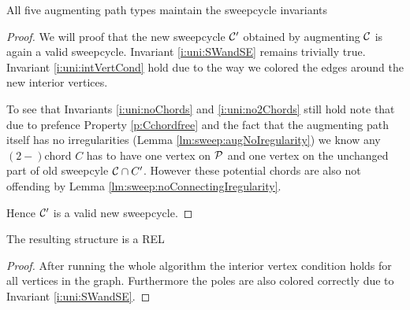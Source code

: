     \begin{lemma}
      All five augmenting path types maintain the sweepcycle invariants
    \end{lemma}
    \begin{proof}
      We will proof that the new sweepcycle $\C'$ obtained by augmenting $\C$ is again a valid sweepcycle. Invariant \ref{i:uni:SWandSE} remains trivially true. Invariant \ref{i:uni:intVertCond} hold due to the way we colored the edges around the new interior vertices.

      To see that Invariants \ref{i:uni:noChords} and \ref{i:uni:no2Chords} still hold note that due to prefence Property \ref{p:Cchordfree} and the fact that the augmenting path itself has no irregularities (Lemma \ref{lm:sweep:augNoIregularity})
      we know any $(2-)$chord $C$ has to have one vertex on $\P$ and one vertex on the unchanged part of old sweepcyle $\C \cap C'$. However these potential chords are also not offending by Lemma \ref{lm:sweep:noConnectingIregularity}.

      Hence $\C'$ is a valid new sweepcycle.
    \end{proof}

    \begin{lemma}
      \label{lm:sweep:REL}
      The resulting structure is a REL
    \end{lemma}

    \begin{proof}
      After running the whole algorithm the interior vertex condition holds for all vertices in the graph. Furthermore the poles are also colored correctly due to Invariant \ref{i:uni:SWandSE}.
    \end{proof}

